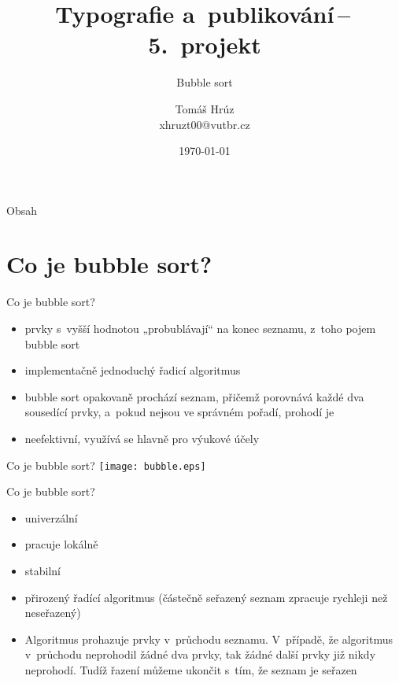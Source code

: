 \documentclass[10pt ]{beamer}
\title{Typografie a~publikování\,--\,5.~projekt}
\subtitle{Bubble sort}
\author{Tomáš Hrúz\texorpdfstring{\\ xhruzt00@vutbr.cz}{}}
\date{\today}
\institute
{
	Vysoké učení technické v~Brně\\
	Fakulta informačních technologií
}
\begin{document}
\maketitle



\begin{frame}{Obsah}
\tableofcontents[hideallsubsections]
\end{frame}

\section{Co je bubble sort?}

\begin{frame}{Co je bubble sort?}
\begin{itemize}
\item prvky s~vyšší hodnotou „probublávají“ na konec seznamu, z~toho pojem bubble sort
\item implementačně jednoduchý řadicí algoritmus
\item bubble sort opakovaně prochází seznam, přičemž porovnává každé dva sousedící prvky, a~pokud nejsou ve správném pořadí, prohodí je
\item neefektivní, využívá se hlavně pro výukové účely
\end{itemize}
\end{frame}

\begin{frame}{Co je bubble sort?}
\centering
\texttt{[image: bubble.eps]}
\end{frame}

\begin{frame}{Co je bubble sort?}
\begin{itemize}
\item univerzální
\item pracuje lokálně
\item stabilní
\item přirozený řadící algoritmus (částečně seřazený seznam zpracuje rychleji než neseřazený)
\item Algoritmus prohazuje prvky v~průchodu seznamu. V~případě, že algoritmus v~průchodu neprohodil žádné dva prvky, tak žádné další prvky již nikdy neprohodí. Tudíž řazení můžeme ukončit s~tím, že seznam je seřazen
\end{itemize}
\end{frame}
\end{document}
